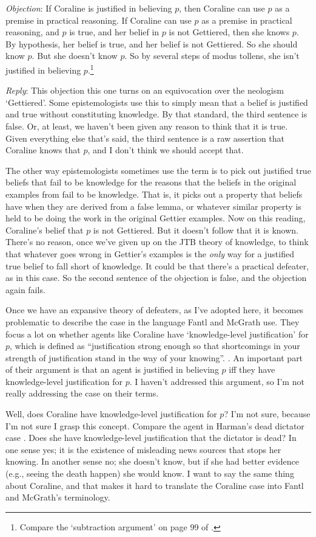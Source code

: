 \documentclass[11pt,oneside]{book}
\newcommand{\objrep}[2]{
\bigskip
\noindent \textit{Objection}: #1

\medskip
\noindent \textit{Reply}: #2

}
\begin{document}
\objrep{If Coraline is justified in believing $p$, then Coraline can use $p$ as a premise in practical reasoning. If Coraline can use $p$ as a premise in practical reasoning, and $p$ is true, and her belief in $p$ is not Gettiered, then she knows $p$. By hypothesis, her belief is true, and her belief is not Gettiered. So she should know $p$. But she doesn't know $p$. So by several steps of modus tollens, she isn't justified in believing $p$.\footnote{Compare the `subtraction argument' on page 99 of \cite{FantlMcGrath2009}.}}
{This  objection this one turns on an equivocation over the neologism `Gettiered'. Some epistemologists use this to simply mean that a belief is justified and true without constituting knowledge. By that standard, the third sentence is false. Or, at least, we haven't been given any reason to think that it is true. Given everything else that's said, the third sentence is a raw assertion that Coraline knows that $p$, and I don't think we should accept that.

The other way epistemologists sometimes use the term is to pick out justified true beliefs that fail to be knowledge for the reasons that the beliefs in the original examples from \cite{Gettier1963} fail to be knowledge. That is, it picks out a property that beliefs have when they are derived from a false lemma, or whatever similar property is held to be doing the work in the original Gettier examples. Now on this reading, Coraline's belief that $p$ is not Gettiered. But it doesn't follow that it is known. There's no reason, once we've given up on the JTB theory of knowledge, to think that whatever goes wrong in Gettier's examples is the \textit{only} way for a justified true belief to fall short of knowledge. It could be that there's a practical defeater, as in this case. So the second sentence of the objection is false, and the objection again fails.

Once we have an expansive theory of defeaters, as I've adopted here, it becomes problematic to describe the case in the language Fantl and McGrath use. They focus a lot on whether agents like Coraline have `knowledge-level justification' for $p$, which is defined as ``justification strong enough so that shortcomings in your strength of justification stand in the way of your knowing''. \citep[97]{FantlMcGrath2009}. An important part of their argument is that an agent is justified in believing $p$ iff they have knowledge-level justification for $p$. I haven't addressed this argument, so I'm not really addressing the case on their terms.

Well, does Coraline have knowledge-level justification for $p$? I'm not sure, because I'm not sure I grasp this concept. Compare the agent in Harman's dead dictator case \citep[75]{Harman1973}. Does she have knowledge-level justification that the dictator is dead? In one sense yes; it is the existence of misleading news sources that stops her knowing. In another sense no; she doesn't know, but if she had better evidence (e.g., seeing the death happen) she would know. I want to say the same thing about Coraline, and that makes it hard to translate the Coraline case into Fantl and McGrath's terminology.}

%



\end{document}
